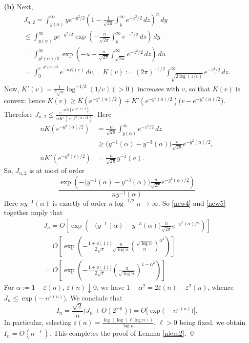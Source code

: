 \documentclass[10pt,a4paper]{amsart}
\def\a{\alpha}
\def\eps{\varepsilon}
\newenvironment{proof}{\noindent{\bf Proof:}}{\qed}
\begin{document}
\begin{proof}
{\bf (b)\/} Next,
\begin{multline*}
J_{n,2}=\int_{y(\a)}^{\infty}ye^{-y^2/2}\left(1-\frac{1}{\sqrt{2\pi}}\int_y^{\infty}e^{-z^2/2}\,dz\right)^n\,dy\\
\le \int_{y(\a)}^{\infty}ye^{-y^2/2}
\exp\left(-\frac{n}{\sqrt{2\pi}}\int_y^{\infty}e^{-z^2/2}\,dz\right)\,dy\\
=\int_{y^2(\a)/2}^{\infty}\exp\left(-u-\frac{n}{\sqrt{2\pi}}\int_{\sqrt{2u}}^{\infty}e^{-z^2/2}\,dz\right)\,du\\
=\int_{0}^{e^{-y^2(\a)/2}}e^{-nK(v)}\,dv, \quad K(v):=(2\pi)^{-1/2}\int_{\sqrt{2\log(1/v)}}^{\infty}e^{-z^2/2}\,dz.
\end{multline*}
Now, $K'(v)=\frac{1}{2\sqrt{\pi}}\log^{-1/2}(1/v)(>0)$ increases with $v$, so that $K(v)$ is convex; hence
$
K(v)\ge K(e^{-y^2(\a)/2})+K'(e^{-y^2(a)/2})\bigl(v-e^{-y^2(\a)/2}\bigr).
$
Therefore 
$
J_{n,2}\le \frac{e^{-nK(e^{-y^2(\a)/2})}}{nK'(e^{-y^2(\a)/2})}.
$
Here
\begin{align*}
nK(e^{-y^2(\a)/2})&=\frac{n}{\sqrt{2\pi}}\int_{y(\a)}^{\infty}e^{-z^2/2}\,dz\\
&\ge \bigl(y^{-1}(\a) -y^{-3}(\a)\bigr)\frac{n}{\sqrt{2\pi}}e^{-y^2(\a)/2},\\
nK'(e^{-y^2(\eps)/2})&=\frac{n}{\sqrt{2\pi}}y^{-1}(a).
\end{align*}
So, $J_{n,2}$ is at most of order
\begin{equation}\label{new5}
\frac{\exp\left(-\bigl(y^{-1}(\a) -y^{-3}(\a)\bigr)\frac{n}{\sqrt{2\pi}}e^{-y^2(\a)/2}\right)}{ny^{-1}(\a)}
\end{equation}
Here $ny^{-1}(\a)$ is exactly of order $n\log^{-1/2} n\to \infty$. So \eqref{new4} and \eqref{new5} together imply that 
\begin{multline*}
J_n=O\left[\exp\left(-\bigl(y^{-1}(\a)-y^{-3}(\a)\bigr)\frac{n}{\sqrt{2\pi}}e^{-y^2(\a)/2}\right)\right]\\
=O\left[\exp\left(-\frac{1+o(1))}{2\sqrt{\pi}}\frac{n}{\sqrt{\log n}}\left(\frac{\sqrt{\log n}}{n}\right)^{\a^2}\right)\right]\\
=O\left[\exp\left(-\frac{1+o(1))}{2\sqrt{\pi}}\left(\frac{n}{\sqrt{\log n}}\right)^{1-\a^2}\right)\right]
\end{multline*}
For $\a:=1- \eps(n)$, $\eps(n)\downarrow 0$, we have $1-\a^2=2\eps(n)-\eps^2(n)$, whence $J_n\le \exp\bigl(-n^{\eps(n)}\bigr)$.
We conclude that
\[
I_n=\frac{\sqrt{2}}{n}\bigl(J_n+O(2^{-n})\bigr)=O\bigl[\exp\bigl(-n^{\eps(n)})\bigr].
\]
In particular, selecting $\eps(n)=\frac{\log(\log(\ell\log n))}{\log n}$, $\ell>0$ being fixed. we obtain $I_n=O(n^{-\ell})$. This completes the proof of Lemma \ref{nlem2}.
\end{proof}
\end{document}
